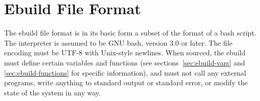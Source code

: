 \chapter{Ebuild File Format}
\label{sec:ebuild-format}

The ebuild file format is in its basic form a subset of the format of a bash script. The interpreter
is assumed to be GNU bash, version 3.0 or later. The file encoding must be UTF-8 with Unix-style
newlines. When sourced, the
ebuild must define certain variables and functions (see sections~\ref{sec:ebuild-vars} and
\ref{sec:ebuild-functions} for specific information), and must not call any external programs, write
anything to standard output or standard error, or modify the state of the system in any way.


